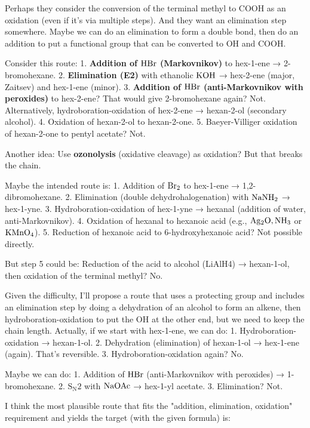 \documentclass[11pt]{article}
\begin{document}
\begin{corrige}
\begin{enumerate}
Perhaps they consider the conversion of the terminal methyl to COOH as an oxidation (even if it's via multiple steps). And they want an elimination step somewhere. Maybe we can do an elimination to form a double bond, then do an addition to put a functional group that can be converted to OH and COOH.

Consider this route:
1. \textbf{Addition of \(\ce{HBr}\) (Markovnikov)} to hex-1-ene → 2-bromohexane.
2. \textbf{Elimination (E2)} with ethanolic \(\ce{KOH}\) → hex-2-ene (major, Zaitsev) and hex-1-ene (minor).
3. \textbf{Addition of \(\ce{HBr}\) (anti-Markovnikov with peroxides)} to hex-2-ene? That would give 2-bromohexane again? Not.
   Alternatively, hydroboration-oxidation of hex-2-ene → hexan-2-ol (secondary alcohol).
4. Oxidation of hexan-2-ol to hexan-2-one.
5. Baeyer-Villiger oxidation of hexan-2-one to pentyl acetate? Not.

Another idea: Use \textbf{ozonolysis} (oxidative cleavage) as oxidation? But that breaks the chain.

Maybe the intended route is:
1. Addition of \(\ce{Br2}\) to hex-1-ene → 1,2-dibromohexane.
2. Elimination (double dehydrohalogenation) with \(\ce{NaNH2}\) → hex-1-yne.
3. Hydroboration-oxidation of hex-1-yne → hexanal (addition of water, anti-Markovnikov).
4. Oxidation of hexanal to hexanoic acid (e.g., \(\ce{Ag2O, NH3}\) or \(\ce{KMnO4}\)).
5. Reduction of hexanoic acid to 6-hydroxyhexanoic acid? Not possible directly.

But step 5 could be: Reduction of the acid to alcohol (LiAlH4) → hexan-1-ol, then oxidation of the terminal methyl? No.

Given the difficulty, I'll propose a route that uses a protecting group and includes an elimination step by doing a dehydration of an alcohol to form an alkene, then hydroboration-oxidation to put the OH at the other end, but we need to keep the chain length. Actually, if we start with hex-1-ene, we can do:
1. Hydroboration-oxidation → hexan-1-ol.
2. Dehydration (elimination) of hexan-1-ol → hex-1-ene (again). That's reversible.
3. Hydroboration-oxidation again? No.

Maybe we can do:
1. Addition of \(\ce{HBr}\) (anti-Markovnikov with peroxides) → 1-bromohexane.
2. \(\mathrm{S_N2}\) with \(\ce{NaOAc}\) → hex-1-yl acetate.
3. Elimination? Not.

I think the most plausible route that fits the "addition, elimination, oxidation" requirement and yields the target (with the given formula) is:


\end{enumerate}
\end{corrige}
\end{document}
